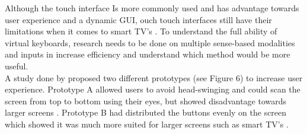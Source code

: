 \documentclass{vgtc}                          %
\begin{document}
Although the touch interface Is more commonly used and has advantage towards user experience and a dynamic GUI, ouch touch interfaces still have their limitations when it comes to smart TV’s \cite{19}. To understand the full ability of virtual keyboards, research needs to be done on multiple sense-based modalities and inputs in increase efficiency and understand which method would be more useful.\\[1em]
A study done by \cite{16} proposed two different prototypes (see Figure 6) to increase user experience. Prototype A allowed users to avoid head-swinging and could scan the screen from top to bottom using their eyes, but showed disadvantage towards larger screens \cite{16} . Prototype B had distributed the buttons evenly on the screen which showed it was much more suited for larger screens such as smart TV’s \cite{16} . \\[1em]
\end{document}

